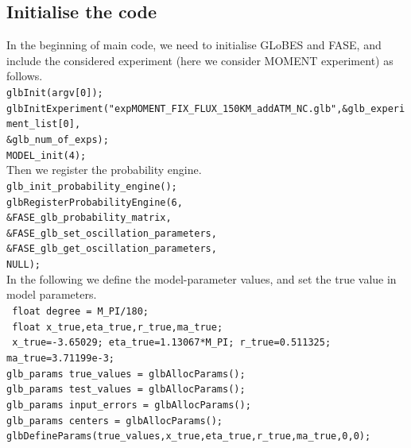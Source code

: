 \documentclass[aps,prd,nofootinbib,preprint]{revtex4}
\begin{document}
\subsection{Initialise the code}
In the beginning of main code, we need to initialise GLoBES and FASE, and include the considered experiment (here we consider MOMENT experiment) as follows.\vspace{0.2cm}\\ 
\texttt{glbInit(argv[0]);}\\
\texttt{glbInitExperiment("expMOMENT\_FIX\_FLUX\_150KM\_addATM\_NC.glb",\&glb\_experiment\_list[0],}\\
\texttt{\&glb\_num\_of\_exps);}\\
\texttt{MODEL\_init(4);}\vspace{0.2cm}\\
Then we register the probability engine.\vspace{0.2cm}\\
\texttt{glb\_init\_probability\_engine();}\\
\texttt{glbRegisterProbabilityEngine(6,\\
                                 \&FASE\_glb\_probability\_matrix,\\
                                 \&FASE\_glb\_set\_oscillation\_parameters,\\
                                 \&FASE\_glb\_get\_oscillation\_parameters,\\
                                 NULL); }\vspace{0.2cm}\\                                 
In the following we define the model-parameter values, and set the true value in model parameters.\vspace{0.2cm}\\
\texttt{     float degree   = M\_PI/180;}\\
\texttt{     float x\_true,eta\_true,r\_true,ma\_true;}\\
\texttt{    x\_true=-3.65029; eta\_true=1.13067*M\_PI; r\_true=0.511325; ma\_true=3.71199e-3;}\\
%
\texttt{glb\_params true\_values = glbAllocParams();}\\
\texttt{glb\_params test\_values = glbAllocParams();}\\
\texttt{glb\_params input\_errors  = glbAllocParams();}\\
\texttt{glb\_params centers         = glbAllocParams();}\\
\texttt{glbDefineParams(true\_values,x\_true,eta\_true,r\_true,ma\_true,0,0);}\\
\end{document}
